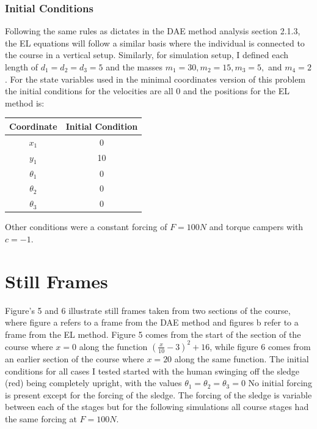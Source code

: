 \documentclass{article}
\begin{document}
\subsubsection{Initial Conditions}
Following the same rules as dictates in the DAE method analysis section 2.1.3, the EL equations will follow a similar basis where the individual is connected to the course in a vertical setup. Similarly, for simulation setup, I defined each length of $d_1=d_2=d_3=5$ and the masses $m_1=30, m_2=15,m_3=5,$ and $m_4=2$. For the state variables used in the minimal coordinates version of this problem the initial conditions for the velocities are all 0 and the positions for the EL method is:
\begin{center}
	\begin{tabular}{c|c}
		Coordinate&Initial Condition\\
		\hline
		$x_1$&0\\
		$y_1$&10\\
		$\theta_1$&0\\
		$\theta_2$&0\\
		$\theta_3$&0
	\end{tabular}
\end{center}
Other conditions were a constant forcing of $F = 100N$ and torque campers with $c = -1$.
\newpage
\section{Still Frames}
Figure's 5 and 6 illustrate still frames taken from two sections of the course, where figure a refers to a frame from the DAE method and figures b refer to a frame from the EL method. Figure 5 comes from the start of the section of the course where $x = 0$ along the function $(\frac{x}{10}-3)^2+16$, while figure 6 comes from an earlier section of the course where $x=20$ along the same function. The initial conditions for all cases I tested started with the human swinging off the sledge (red) being completely upright, with the values $\theta_1 = \theta_2 = \theta_3=0$ No initial forcing is present except for the forcing of the sledge. The forcing of the sledge is variable between each of the stages but for the following simulations all course stages had the same forcing at $F = 100N$.
\end{document}
